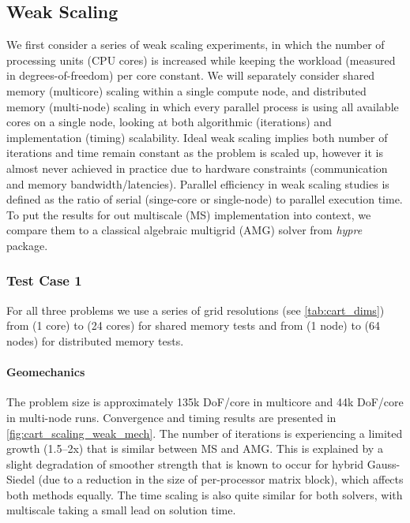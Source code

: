 \subsection{Weak Scaling}
\label{subsec:par_scaling_weak}

We first consider a series of weak scaling experiments, in which the number of processing units (CPU cores) is increased while keeping the workload (measured in degrees-of-freedom) per core constant.   We will separately consider shared memory (multicore) scaling within a single compute node, and distributed memory (multi-node) scaling in which every parallel process is using all available cores on a single node, looking at both algorithmic (iterations) and implementation (timing) scalability.   Ideal weak scaling implies both number of iterations and time remain constant as the problem is scaled up, however it is almost never achieved in practice due to hardware constraints (communication and memory bandwidth/latencies).   Parallel efficiency in weak scaling studies is defined as the ratio of serial (singe-core or single-node) to parallel execution time.   To put the results for out multiscale (MS) implementation into context, we compare them to a classical algebraic multigrid (AMG) solver from \textit{hypre} package. 

\subsubsection{Test Case 1}

For all three problems we use a series of grid resolutions (see \cref{tab:cart_dims}) from  (1 core) to  (24 cores) for shared memory tests and from  (1 node) to  (64 nodes) for distributed memory tests.   

\paragraph{Geomechanics}
The problem size is approximately 135k DoF/core in multicore and 44k DoF/core in multi-node runs.   Convergence and timing results are presented in \cref{fig:cart_scaling_weak_mech}.   The number of iterations is experiencing a limited growth (1.5--2x) that is similar between MS and AMG.   This is explained by a slight degradation of smoother strength that is known to occur for hybrid Gauss-Siedel (due to a reduction in the size of per-processor matrix block), which affects both methods equally.   The time scaling is also quite similar for both solvers, with multiscale taking a small lead on solution time.


